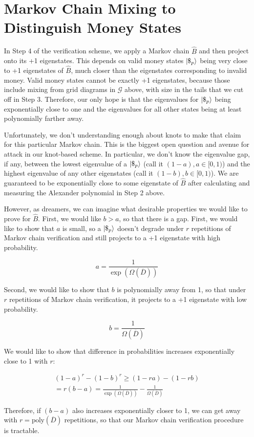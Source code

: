 \section{Markov Chain Mixing to Distinguish Money States}

In Step 4 of the verification scheme, we apply a Markov chain
$\hat{B}$ and then
project onto its +1 eigenstates. This depends on valid money states
$|\$_p \rangle$
being very close to +1 eigenstates of $\hat{B}$, much closer than
the eigenstates corresponding to invalid money. 
Valid money states cannot be exactly +1 eigenstates, because those
include mixing from grid diagrams in $\mathcal{G}$ above,
with size in the tails that we cut off in Step 3. Therefore, our only
hope is that the eigenvalues for $|\$_p \rangle$ being exponentially
close to one and the eigenvalues for all other states being at least
polynomially farther away.

Unfortunately, we don't understanding enough about knots to make that
claim for this particular Markov chain. This is the biggest open
question and avenue for attack in our knot-based scheme.
In particular, we don't know
the eigenvalue gap, if any, between the lowest eigenvalue of
a $|\$_p \rangle$ (call it $(1-a), a \in [0,1)$) and the highest eigenvalue of any other
eigenstates (call it $(1-b), b \in [0,1)$). We are guaranteed to be exponentially close
to some eigenstate of $\hat{B}$ after calculating and measuring the
Alexander polynomial in Step 2 above.

However, as dreamers, we can imagine what desirable properties we would
like to prove for $\hat{B}$. First, we would like $b > a$, so that
there is a gap. First, we would like to show that $a$ is
small, so a $|\$_p \rangle$ doesn't degrade under
$r$ repetitions of Markov chain verification and still projects
to a +1 eigenstate with high probability.

\begin{displaymath}
a = \frac{1}{\exp(\Omega(\overline{D}))}
\end{displaymath}

Second, we would like to show that $b$ is polynomially away from 1, so
that under $r$ repetitions of Markov chain verification, it
projects to a +1 eigenstate with low probability.

\begin{displaymath}
b = \frac{1}{\Omega(\overline{D})}
\end{displaymath}

We would like to show that difference in probabilities increases
exponentially close to 1 with $r$:

\begin{multline*}
(1-a)^r - (1-b)^r \ge (1 - ra) - (1 - rb) \\
= r(b-a) =
\frac{1}{\exp(\Omega(\overline{D}))} - \frac{1}{\Omega(\overline{D})}
\end{multline*}

Therefore, if $(b-a)$ also increases exponentially closer to 1, we can
get away with $r = \textrm{poly}(\overline{D})$ repetitions, so that our
Markov chain verification procedure is tractable.